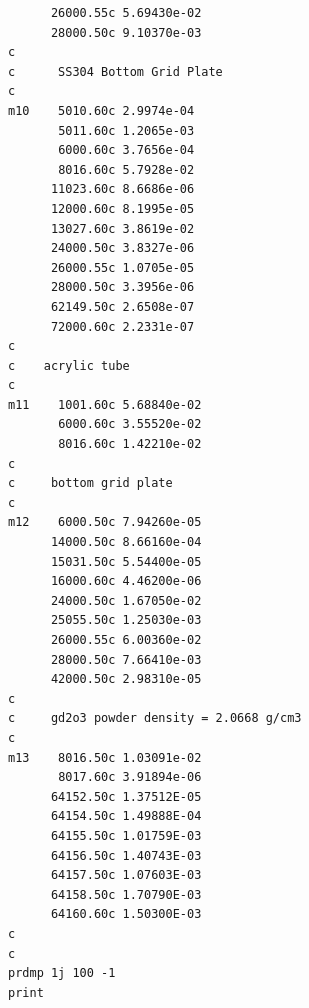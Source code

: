 \documentclass[
	12pt,				%
	openany,			%
	twoside,			%
	a4paper,			%
	english,			%
	french,				%
	spanish,			%
	brazil				%
	]{abntex2}
\begin{document}
\begin{apendicesenv}
\begin{lstlisting}
      26000.55c 5.69430e-02 
      28000.50c 9.10370e-03 
c
c      SS304 Bottom Grid Plate
c
m10    5010.60c 2.9974e-04 
       5011.60c 1.2065e-03 
       6000.60c 3.7656e-04
       8016.60c 5.7928e-02 
      11023.60c 8.6686e-06
      12000.60c 8.1995e-05
      13027.60c 3.8619e-02
      24000.50c 3.8327e-06
      26000.55c 1.0705e-05
      28000.50c 3.3956e-06 
      62149.50c 2.6508e-07
      72000.60c 2.2331e-07
c
c    acrylic tube
c
m11    1001.60c 5.68840e-02 
       6000.60c 3.55520e-02
       8016.60c 1.42210e-02 
c
c     bottom grid plate
c
m12    6000.50c 7.94260e-05
      14000.50c 8.66160e-04 
      15031.50c 5.54400e-05
      16000.60c 4.46200e-06 
      24000.50c 1.67050e-02
      25055.50c 1.25030e-03 
      26000.55c 6.00360e-02
      28000.50c 7.66410e-03 
      42000.50c 2.98310e-05
c
c     gd2o3 powder density = 2.0668 g/cm3 
c
m13    8016.50c 1.03091e-02
       8017.60c 3.91894e-06
      64152.50c 1.37512E-05 
      64154.50c 1.49888E-04
      64155.50c 1.01759E-03 
      64156.50c 1.40743E-03 
      64157.50c 1.07603E-03
      64158.50c 1.70790E-03 
      64160.60c 1.50300E-03 
c
c
prdmp 1j 100 -1
print
\end{lstlisting}

\end{apendicesenv}


\end{document}
